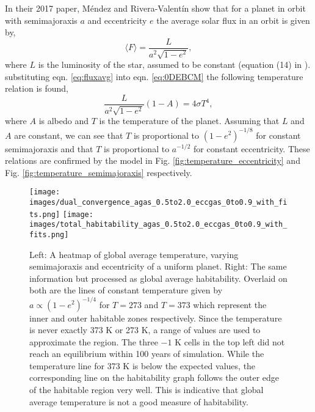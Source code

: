 \documentclass[12pt, onecolumn]{revtex4-2}    %
\begin{document}
In their 2017 paper, Méndez and Rivera-Valentín show that for a planet in orbit with semimajoraxis $a$ and eccentricity $e$ the average solar flux in an orbit is given by,
\begin{equation} \label{eq:fluxavg}
    \langle F\rangle = \frac{L}{a^2 \sqrt{1-e^2}},
\end{equation}
where $L$ is the luminosity of the star, assumed to be constant (equation (14) in \cite{Mendez2017}).
substituting eqn. \eqref{eq:fluxavg} into eqn. \eqref{eq:0DEBCM} the following temperature relation is found,
\begin{equation}
    \frac{L}{a^2 \sqrt{1-e^2}} (1-A) = 4 \sigma T^4,
    \label{eq:Temp_eccent}
\end{equation}
where $A$ is albedo and $T$ is the temperature of the planet.
Assuming that $L$ and $A$ are constant, we can see that $T$ is proportional to $(1-e^2)^{-1/8}$ for constant semimajoraxis and that $T$ is proportional to $a^{-1/2}$ for constant eccentricity.
These relations are confirmed by the model in Fig. \ref{fig:temperature_eccentricity} and Fig. \ref{fig:temperature_semimajoraxis} respectively.

\begin{figure}
    \texttt{[image: images/dual\_convergence\_agas\_0.5to2.0\_eccgas\_0to0.9\_with\_fits.png]}
    \texttt{[image: images/total\_habitability\_agas\_0.5to2.0\_eccgas\_0to0.9\_with\_fits.png]}
    \caption{Left: A heatmap of global average temperature, varying semimajoraxis and eccentricity of a uniform planet.
        Right: The same information but processed as global average habitability.
        Overlaid on both are the lines of constant temperature given by $a \propto (1-e^2)^{-1/4}$ for $T = 273$ and $T = 373$ which represent the inner and outer habitable zones respectively.
        Since the temperature is never exactly 373 K or 273 K, a range of values are used to approximate the region.
        The three $-1$ K cells in the top left did not reach an equilibrium within 100 years of simulation.
        While the temperature line for 373 K is below the expected values, the corresponding line on the habitability graph follows the outer edge of the habitable region very well.
        This is indicative that global average temperature is not a good measure of habitability.
    }
    \label{fig:semiecc_temphab}
\end{figure}
\end{document}
